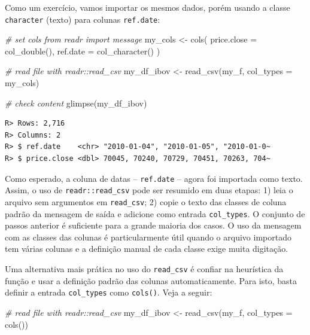 \documentclass[
  11pt,
]{book}
\newenvironment{Shaded}{\begin{snugshade}}{\end{snugshade}}
\newcommand{\AttributeTok}[1]{\textcolor[rgb]{0.61,0.61,0.61}{#1}}
\newcommand{\CommentTok}[1]{\textcolor[rgb]{0.37,0.37,0.37}{\textit{#1}}}
\newcommand{\FunctionTok}[1]{\textcolor[rgb]{0,0,0}{#1}}
\newcommand{\NormalTok}[1]{#1}
\newcommand{\OtherTok}[1]{\textcolor[rgb]{0.37,0.37,0.37}{#1}}
\begin{document}
Como um exercício, vamos importar os mesmos dados, porém usando a classe \texttt{character} (texto) para colunas \texttt{ref.date}:

\begin{Shaded}
\begin{Highlighting}[]
\CommentTok{\# set cols from readr import message}
\NormalTok{my\_cols }\OtherTok{\textless{}{-}} \FunctionTok{cols}\NormalTok{(}
  \AttributeTok{price.close =} \FunctionTok{col\_double}\NormalTok{(),}
  \AttributeTok{ref.date =} \FunctionTok{col\_character}\NormalTok{()}
\NormalTok{)}

\CommentTok{\# read file with readr::read\_csv}
\NormalTok{my\_df\_ibov }\OtherTok{\textless{}{-}} \FunctionTok{read\_csv}\NormalTok{(my\_f,}
                       \AttributeTok{col\_types =}\NormalTok{ my\_cols)}

\CommentTok{\# check content}
\FunctionTok{glimpse}\NormalTok{(my\_df\_ibov)}
\end{Highlighting}
\end{Shaded}

\begin{verbatim}
R> Rows: 2,716
R> Columns: 2
R> $ ref.date    <chr> "2010-01-04", "2010-01-05", "2010-01-0~
R> $ price.close <dbl> 70045, 70240, 70729, 70451, 70263, 704~
\end{verbatim}

Como esperado, a coluna de datas -- \texttt{ref.date} -- agora foi importada como texto. Assim, o uso de \texttt{readr::read\_csv} pode ser resumido em duas etapas: 1) leia o arquivo sem argumentos em \texttt{read\_csv}; 2) copie o texto das classes de coluna padrão da mensagem de saída e adicione como entrada \texttt{col\_types}. O conjunto de passos anterior é suficiente para a grande maioria dos casos. O uso da mensagem com as classes das colunas é particularmente útil quando o arquivo importado tem várias colunas e a definição manual de cada classe exige muita digitação.

Uma alternativa mais prática no uso do \texttt{read\_csv} é confiar na heurística da função e usar a definição padrão das colunas automaticamente. Para isto, basta definir a entrada \texttt{col\_types} como \texttt{cols()}. Veja a seguir:

\begin{Shaded}
\begin{Highlighting}[]
\CommentTok{\# read file with readr::read\_csv}
\NormalTok{my\_df\_ibov }\OtherTok{\textless{}{-}} \FunctionTok{read\_csv}\NormalTok{(my\_f,}
                       \AttributeTok{col\_types =} \FunctionTok{cols}\NormalTok{())}
\end{Highlighting}
\end{Shaded}
\end{document}

